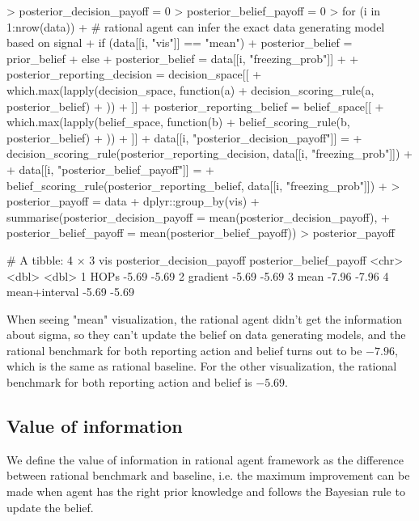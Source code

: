 \documentclass{article}
\begin{document}
\begin{Schunk}
\begin{Sinput}
> posterior_decision_payoff = 0
> posterior_belief_payoff = 0
> for (i in 1:nrow(data)) {
+   # rational agent can infer the exact data generating model based on signal
+   if (data[[i, "vis"]] == "mean") {
+     posterior_belief = prior_belief
+   } else {
+     posterior_belief = data[[i, "freezing_prob"]]
+   }
+   posterior_reporting_decision = decision_space[[
+     which.max(lapply(decision_space, function(a) {
+       decision_scoring_rule(a, posterior_belief)
+     }))
+   ]]
+   posterior_reporting_belief = belief_space[[
+     which.max(lapply(belief_space, function(b) {
+       belief_scoring_rule(b, posterior_belief)
+     }))
+   ]]
+   data[[i, "posterior_decision_payoff"]] = 
+     decision_scoring_rule(posterior_reporting_decision, data[[i, "freezing_prob"]])
+   
+   data[[i, "posterior_belief_payoff"]] = 
+     belief_scoring_rule(posterior_reporting_belief, data[[i, "freezing_prob"]])
+ }
> posterior_payoff = data %>%
+   dplyr::group_by(vis) %>%
+   summarise(posterior_decision_payoff = mean(posterior_decision_payoff),
+             posterior_belief_payoff = mean(posterior_belief_payoff))
> posterior_payoff
\end{Sinput}
\begin{Soutput}
# A tibble: 4 × 3
  vis           posterior_decision_payoff posterior_belief_payoff
  <chr>                             <dbl>                   <dbl>
1 HOPs                              -5.69                   -5.69
2 gradient                          -5.69                   -5.69
3 mean                              -7.96                   -7.96
4 mean+interval                     -5.69                   -5.69
\end{Soutput}
\end{Schunk}

When seeing "mean" visualization, the rational agent didn't get the information about sigma, so they can't update the belief on data generating models, and the rational benchmark for both reporting action and belief turns out to be $-7.96$, which is the same as rational baseline. For the other visualization, the rational benchmark for both reporting action and belief is $-5.69$.

\subsection{Value of information}

We define the value of information in rational agent framework as the difference between rational benchmark and baseline, i.e. the maximum improvement can be made when agent has the right prior knowledge and follows the Bayesian rule to update the belief.
\end{document}
